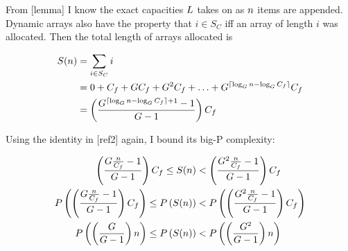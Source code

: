 From [lemma] I know the exact capacities $L$ takes on as $n$ items are appended. Dynamic arrays also have the property that $i \in S_C$ iff an array of length $i$ was allocated. Then the total length of arrays allocated is

\begin{align*}
S(n) &= \sum_{i \in S_C} i\\
&= 0 + C_f + GC_f + G^2C_f + \ldots + G^{\lceil \log_{G} n - \log_{G} C_f \rceil}C_f\\
&= \left( \frac{G^{\lceil \log_{G} n - \log_{G} C_f \rceil + 1} - 1}{G - 1} \right) C_f
\end{align*}

Using the identity in [ref2] again, I bound its big-P complexity:

\begin{align*}
\left( \frac{G \frac{n}{C_f} - 1}{G - 1} \right) C_f \leq S(n) &< \left( \frac{G^2 \frac{n}{C_f} - 1}{G - 1} \right) C_f\\
P\left( \left( \frac{G \frac{n}{C_f} - 1}{G - 1} \right) C_f \right) \leq P\left( S(n) \right) &< P\left( \left( \frac{G^2 \frac{n}{C_f} - 1}{G - 1} \right) C_f \right)\\
P\left( \left( \frac{G}{G - 1} \right) n \right) \leq P\left( S(n) \right) &< P\left( \left( \frac{G^2}{G - 1} \right) n \right)
\end{align*}